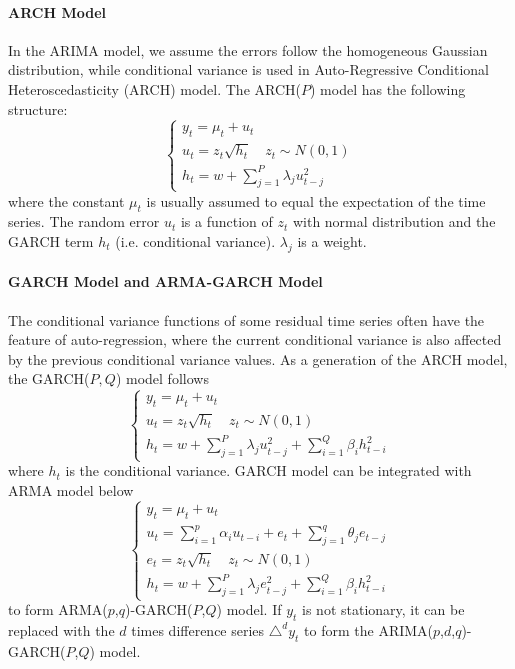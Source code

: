 \paragraph{ARCH Model}

In the ARIMA model, we assume the errors follow the homogeneous Gaussian distribution, while conditional variance is used in Auto-Regressive Conditional Heteroscedasticity (ARCH) model. The ARCH($P$) model has the following structure:
\begin{equation}
\label{ARCH}
    \begin{cases}
      y_t = \mu_t + u_t \\
      u_t = z_t{\sqrt{h_t}}\quad  z_t\sim N(0,1)\\
      h_t = w+\sum_{j=1}^{P} {\lambda_j{u_{t-j}^2}}
    \end{cases}
\end{equation}
where the constant $\mu_t$ is usually assumed to equal the expectation of the time series. The random error $u_t$ is a function of $z_t$ with normal distribution  and the GARCH term $h_t$ (i.e. conditional variance).  $\lambda_j$ is a weight. 

\paragraph{GARCH Model and ARMA-GARCH Model}

The conditional variance functions of some residual time series often have the feature of auto-regression, where the current conditional variance is also affected by the previous conditional variance values. As a generation of the ARCH model, the GARCH($P,Q$) model follows
\begin{equation}
    \begin{cases}
      y_t = \mu_t + u_t \\
      u_t = z_t{\sqrt{h_t}}\quad z_t\sim N(0,1)\\
      h_t = w+\sum_{j=1}^{P} {\lambda_j{u_{t-j}^2}}+\sum_{i=1}^{Q}{\beta_i{h_{t-i}^2}}
    \end{cases}
\end{equation}
where $h_t$ is the conditional variance. GARCH model can be integrated with ARMA model below
\begin{equation}
    \begin{cases}
      y_t = \mu_t + u_t \\
     u_t = \sum_{i=1}^{p} {\alpha_i{u_{t-i}}} + e_t+ \sum_{j=1}^{q} {\theta_j{e_{t-j}}}\\
     e_t = z_t{\sqrt{h_t}} \quad  z_t\sim N(0,1)\\
      h_t = w+\sum_{j=1}^{P} {\lambda_j{e_{t-j}^2}}+\sum_{i=1}^{Q}{\beta_i{h_{t-i}^2}}
    \end{cases}
\end{equation}
to form ARMA($p$,$q$)-GARCH($P$,$Q$) model. If $y_t$ is not stationary, it can be replaced with the $d$ times difference series $\triangle^d$$y_t$  to form the ARIMA($p$,$d$,$q$)-GARCH($P$,$Q$) model.



